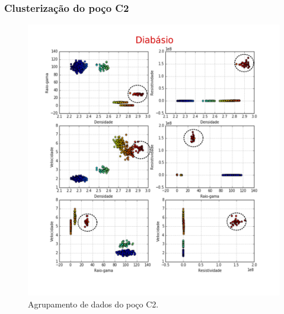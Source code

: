 \documentclass[10pt]{beamer} %
\begin{document}
\begin{frame}
	\frametitle{Clusterização do poço C2}
	\begin{figure}[H]
		\centering
		\includegraphics[scale=0.4]{Imagens/diabasioC2.png}
		\caption{Agrupamento de dados do poço C2.}
	\end{figure} 
\end{frame}
\end{document}
